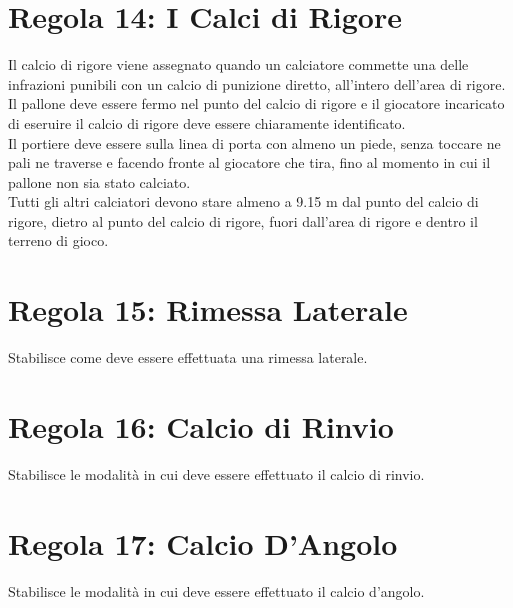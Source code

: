 \documentclass[../uefaC.tex]{subfiles}
\begin{document}
\section{Regola 14: I Calci di Rigore}
Il calcio di rigore viene assegnato quando un calciatore commette una delle infrazioni punibili con un calcio di punizione diretto, all'intero dell'area di rigore. Il pallone deve essere fermo nel punto del calcio di rigore e il giocatore incaricato di eseruire il calcio di rigore deve essere chiaramente identificato. \hfill \\
Il portiere deve essere sulla linea di porta con almeno un piede, senza toccare ne pali ne traverse e facendo fronte al giocatore che tira, fino al momento in cui il pallone non sia stato calciato. \hfill \\
Tutti gli altri calciatori devono stare almeno a 9.15 m dal punto del calcio di rigore, dietro al punto del calcio di rigore, fuori dall'area di rigore e dentro il terreno di gioco.
\section{Regola 15: Rimessa Laterale}
Stabilisce come deve essere effettuata una rimessa laterale.

\section{Regola 16: Calcio di Rinvio}
Stabilisce le modalità in cui deve essere effettuato il calcio di rinvio.

\section{Regola 17: Calcio D'Angolo}
Stabilisce le modalità in cui deve essere effettuato il calcio d'angolo.
\end{document}
